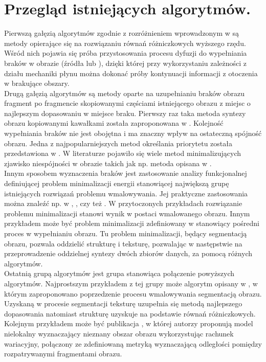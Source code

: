 \documentclass[a4paper,12pt,twoside,openany]{report}
\begin{document}
\chapter{Przegląd istniejących algorytmów.}
Pierwszą gałęzią algorytmów zgodnie z rozróżnieniem wprowadzonym w  \cite{SalientStrucTexProp} są metody opierające się na rozwiązaniu równań różniczkowych wyższego rzędu. Wśród nich pojawia się próba przystosowania procesu dyfuzji do wypełniania braków w obrazie (źródła \cite{bertalmio2000image} lub \cite{BertalmioNavierStokes}), dzięki której przy wykorzystaniu zależności z działu mechaniki płynu można dokonać próby kontynuacji informacji z otoczenia w brakujące obszary. \\
Drugą gałęzią algorytmów są metody oparte na uzupełnianiu braków obrazu fragment po fragmencie skopiowanymi częściami istniejącego obrazu z miejsc o najlepszym dopasowaniu w miejsce braku. Pierwszy raz taka metoda syntezy obrazu kopiowanymi kawałkami została zaproponowana w \cite{efros1999texture}. Kolejność wypełniania braków nie jest obojętna i ma znaczny wpływ na ostateczną spójność obrazu. Jedna z najpopularniejszych metod określania priorytetu została przedstawiona w \cite{criminisi2004region}. W literaturze pojawiło się wiele metod minimalizujących zjawisko niespójności w obrazie takich jak np. metoda opisana w  \cite{StructurePropagationManual}. \\
Innym sposobem wyznaczenia braków jest zastosowanie analizy funkcjonalnej definiującej problem minimalizacji energii stanowiącej największą grupę istniejących rozwiązań problemu wmalowywania. 
Jej praktyczne zastosowania można znaleźć np. w \cite{MathematicalModelsforNLTextureInpainting}, \cite{ColorTextureInpaintingNLCTVModel}, czy też \cite{arias2011variational}. W przytoczonych przykładach rozwiązanie problemu minimalizacji stanowi wynik w postaci wmalowanego obrazu. Innym przykładem może być problem minimalizacji zdefiniowany w \cite{SalientStrucTexProp} stanowiący pośredni proces w wypełnianiu obrazu. Tu problem minimalizacji, będący segmentacją obrazu, pozwala oddzielić strukturę i teksturę, pozwalając w następstwie na przeprowadzenie oddzielnej syntezy dwóch zbiorów danych, za pomocą różnych algorytmów. \\
Ostatnią grupą algorytmów jest grupa stanowiąca połączenie powyższych algorytmów. Najprostszym przykładem z tej grupy może algorytm opisany w \cite{NavierStokesAndTexturePropagation}, w którym zaproponowano poprzedzenie procesu wmalowywania segmentacją obrazu. Uzyskaną w procesie segmentacji teksturę uzupełnia się metodą najlepszego dopasowania natomiast strukturę uzyskuje na podstawie równań różniczkowych. Kolejnym przykładem może być publikacja \cite{arias2011variational}, w której autorzy proponują model nielokalny wyznaczający nieznany obszar obrazu wykorzystując rachunek wariacyjny, połączony ze zdefiniowaną metryką wyznaczającą odległości pomiędzy rozpatrywanymi fragmentami obrazu. \\
\end{document}
